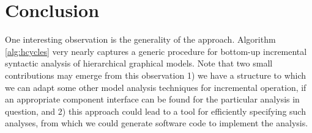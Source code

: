 \section{Conclusion}


One interesting observation is the generality of the approach.  Algorithm 
\ref{alg:hcycles} very nearly captures a generic procedure for bottom-up incremental syntactic analysis of hierarchical graphical models.  Note that two small contributions may emerge from this observation 1) we have a structure to which we can adapt some other model analysis techniques for incremental operation, if an appropriate component interface can be found for the particular analysis in question, and 2) this approach could lead to a tool for efficiently specifying such analyses, from which we could generate software code to implement the analysis.

